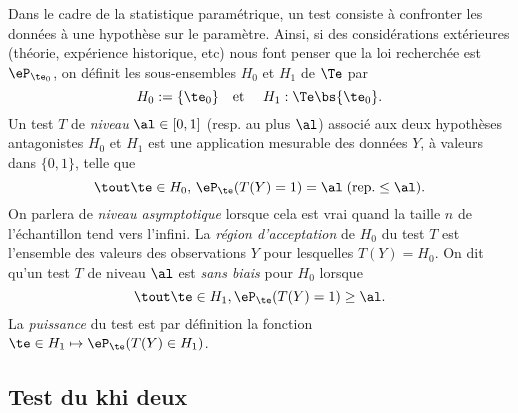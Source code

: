Dans le cadre de la statistique paramétrique, un test consiste à confronter
les données à une hypothèse sur le paramètre. Ainsi, si des considérations
extérieures (théorie, expérience historique, etc) nous font penser que la loi
recherchée est $\eP_{\te_0}$, on définit les sous-ensembles $H_0$ et $H_1$ de
$\Te$ par
$$
H_0:=\{\te_0\}
\text{\quad et \quad}
H_1: \Te\bs\{\te_0\}.
$$
Un test $T$ de \emph{niveau} $\al\in[0,1]$ (resp. au plus $\al$) associé aux
deux hypothèses antagonistes $H_0$ et $H_1$ est une application mesurable des
données $Y$, à valeurs dans $\{0,1\}$, telle que
$$
\tout\te\in H_0,\,\eP_\te(T(Y)=1) = \al\; (\text{rep.} \leq \al).
$$
On parlera de \emph{niveau asymptotique} lorsque cela est vrai quand la
taille $n$ de l'échantillon tend vers l'infini. La \emph{région d'acceptation}
de $H_0$ du test $T$ est l'ensemble des valeurs des observations $Y$ pour
lesquelles $T(Y)=H_0$. On dit qu'un test $T$ de niveau $\al$ est \emph{sans
  biais} pour $H_0$ lorsque
$$
\tout\te\in H_1, \eP_\te(T(Y)=1) \geq \al.
$$
La \emph{puissance} du test est par définition la fonction $\te\in H_1
\mapsto \eP_\te(T(Y)\in H_1)$.


%
\subsection{Test du khi deux}
\label{ss:test-chideux}
%

